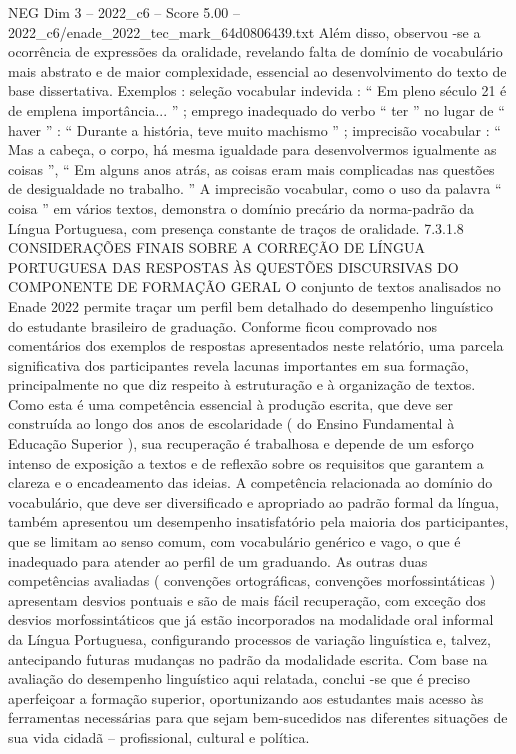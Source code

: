 \begin{textsample}{NEG Dim 3 – 2022\_c6 – Score 5.00 – 2022\_c6/enade\_2022\_tec\_mark\_64d0806439.txt}
Além disso, observou -se a ocorrência de expressões da oralidade, revelando falta de domínio de vocabulário mais abstrato e de maior complexidade, essencial ao desenvolvimento do texto de base dissertativa.
Exemplos : seleção vocabular indevida : “ Em pleno século 21 é de emplena importância... ” ; emprego inadequado do verbo “ ter ” no lugar de “ haver ” : “ Durante a história, teve muito machismo ” ; imprecisão vocabular : “ Mas a cabeça, o corpo, há mesma igualdade para desenvolvermos igualmente as coisas ”, “ Em alguns anos atrás, as coisas eram mais complicadas nas questões de desigualdade no trabalho. ” A imprecisão vocabular, como o uso da palavra “ coisa ” em vários textos, demonstra o domínio precário da norma-padrão da Língua Portuguesa, com presença constante de traços de oralidade. 7.3.1.8 CONSIDERAÇÕES FINAIS SOBRE A CORREÇÃO DE LÍNGUA PORTUGUESA DAS RESPOSTAS ÀS QUESTÕES DISCURSIVAS DO COMPONENTE DE FORMAÇÃO GERAL O conjunto de textos analisados no Enade 2022 permite traçar um perfil bem detalhado do desempenho linguístico do estudante brasileiro de graduação.
Conforme ficou comprovado nos comentários dos exemplos de respostas apresentados neste relatório, uma parcela significativa dos participantes revela lacunas importantes em sua formação, principalmente no que diz respeito à estruturação e à organização de textos.
Como esta é uma competência essencial à produção escrita, que deve ser construída ao longo dos anos de escolaridade ( do Ensino Fundamental à Educação Superior ), sua recuperação é trabalhosa e depende de um esforço intenso de exposição a textos e de reflexão sobre os requisitos que garantem a clareza e o encadeamento das ideias.
A competência relacionada ao domínio do vocabulário, que deve ser diversificado e apropriado ao padrão formal da língua, também apresentou um desempenho insatisfatório pela maioria dos participantes, que se limitam ao senso comum, com vocabulário genérico e vago, o que é inadequado para atender ao perfil de um graduando.
As outras duas competências avaliadas ( convenções ortográficas, convenções morfossintáticas ) apresentam desvios pontuais e são de mais fácil recuperação, com exceção dos desvios morfossintáticos que já estão incorporados na modalidade oral informal da Língua Portuguesa, configurando processos de variação linguística e, talvez, antecipando futuras mudanças no padrão da modalidade escrita.
Com base na avaliação do desempenho linguístico aqui relatada, conclui -se que é preciso aperfeiçoar a formação superior, oportunizando aos estudantes mais acesso às ferramentas necessárias para que sejam bem-sucedidos nas diferentes situações de sua vida cidadã – profissional, cultural e política.

\end{textsample}
